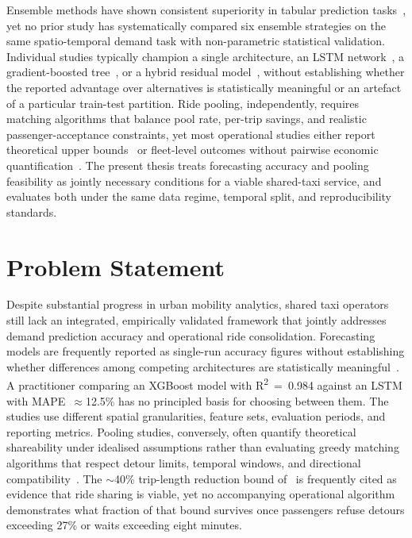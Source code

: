 Ensemble methods have shown consistent superiority in tabular prediction tasks~\parencite{breiman2001rf,chen2016xgboost,wolpert1992stacking}, yet no prior study has systematically compared six ensemble strategies on the same spatio-temporal demand task with non-parametric statistical validation. Individual studies typically champion a single architecture, an LSTM network~\parencite{xu2017realtime}, a gradient-boosted tree~\parencite{liu2021epidemic}, or a hybrid residual model~\parencite{kim2020hybrid}, without establishing whether the reported advantage over alternatives is statistically meaningful or an artefact of a particular train-test partition. Ride pooling, independently, requires matching algorithms that balance pool rate, per-trip savings, and realistic passenger-acceptance constraints, yet most operational studies either report theoretical upper bounds~\parencite{santi2014quantifying} or fleet-level outcomes without pairwise economic quantification~\parencite{alonso2017demand}. The present thesis treats forecasting accuracy and pooling feasibility as jointly necessary conditions for a viable shared-taxi service, and evaluates both under the same data regime, temporal split, and reproducibility standards.

\section{Problem Statement}

Despite substantial progress in urban mobility analytics, shared taxi operators still lack an integrated, empirically validated framework that jointly addresses demand prediction accuracy and operational ride consolidation. Forecasting models are frequently reported as single-run accuracy figures without establishing whether differences among competing architectures are statistically meaningful~\parencite{kim2020hybrid,liu2021epidemic,xu2017realtime}. A practitioner comparing an XGBoost model with R\textsuperscript{2}~=~0.984 against an LSTM with MAPE~$\approx$12.5\% has no principled basis for choosing between them. The studies use different spatial granularities, feature sets, evaluation periods, and reporting metrics. Pooling studies, conversely, often quantify theoretical shareability under idealised assumptions rather than evaluating greedy matching algorithms that respect detour limits, temporal windows, and directional compatibility~\parencite{santi2014quantifying,agatz2012ridesharing}. The $\sim$40\% trip-length reduction bound of~\parencite{santi2014quantifying} is frequently cited as evidence that ride sharing is viable, yet no accompanying operational algorithm demonstrates what fraction of that bound survives once passengers refuse detours exceeding 27\% or waits exceeding eight minutes.

